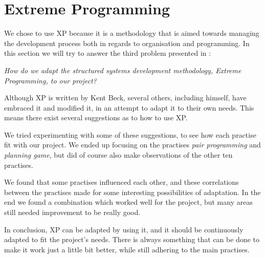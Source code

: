 \section{Extreme Programming}
We chose to use XP because it is a methodology that is aimed towards managing the development process both in regards to organisation and programming. 
In this section we will try to answer the third problem presented in :
\begin{center}
	\textit{How do we adapt the structured systems development methodology, Extreme Programming, to our project?}
\end{center}

\noindent Although XP is written by Kent Beck, several others, including himself, have embraced it and modified it, in an attempt to adapt it to their own needs.
This means there exist several suggestions as to how to use XP.

We tried experimenting with some of these suggestions, to see how each practise fit with our project.
We ended up focusing on the practises \textit{pair programming} and \textit{planning game}, but did of course also make observations of the other ten practises.

We found that some practises influenced each other, and these correlations between the practises made for some interesting possibilities of adaptation.
In the end we found a combination which worked well for the project, but many areas still needed improvement to be really good.

In conclusion, XP can be adapted by using it, and it should be continuously adapted to fit the project's needs. There is always something that can be done to make it work just a little bit better, while still adhering to the main practises.